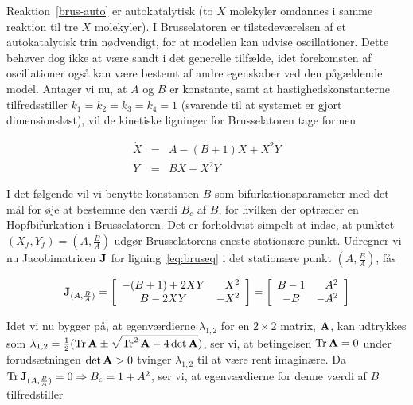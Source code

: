 Reaktion~\ref{brus-auto} er autokatalytisk (to $X$
molekyler omdannes i samme reaktion til tre $X$ molekyler).
I Brusselatoren er tilstedev{\ae}relsen af et
autokatalytisk trin n{\o}dvendigt, for at modellen kan
udvise oscillationer. Dette beh{\o}ver dog ikke at v{\ae}re
sandt i det generelle tilf{\ae}lde, idet forekomsten af
oscillationer ogs{\aa} kan v{\ae}re bestemt af andre
egenskaber ved den p{\aa}g{\ae}ld\-ende model. Antager vi
nu, at $A$ og $B$ er konstante, samt at
hastighedskonstanterne tilfredsstiller $k_1=k_2=k_3=k_4=1$
(svarende til at sy\-stemet er gjort dimensionsl{\o}st),
vil de kinetiske lig\-ninger for Brusselatoren tage formen

\begin{equation}
 \begin{array}{lcl}
  \dot{X} & = & A - (B+1)X + X^2Y \\
  \dot{Y} & = & BX - X^2Y
 \end{array}
 \label{eq:bruseq}
\end{equation}

I det f{\o}lgende vil vi benytte konstanten $B$ som
bifurkationsparameter med det m{\aa}l for {\o}je at
bestemme den v{\ae}rdi $B_c$ af $B$, for hvilken der
optr{\ae}der en Hopfbifurkation i Brusselatoren. Det er
forholdvist simpelt at indse, at punktet
$(X_f,Y_f)=(A,\frac{B}{A})$ udg{\o}r Brusselatorens eneste
station{\ae}re punkt. Udregner vi nu Jacobimatricen ${\bf
J}$ for lig\-ning~\ref{eq:bruseq} i det station{\ae}re
punkt $(A,\frac{B}{A})$, f{\aa}s

\begin{equation}
 {\bf J}_{(A,\frac{B}{A})} =
 \left[
 \begin{array}{cr}
  -(B+1)+2XY &  X^2 \\
      B-2XY  & -X^2
 \end{array}
 \right]
 =
 \left[
 \begin{array}{cr}
  B-1 &  A^2 \\
  -B  & -A^2
 \end{array}
 \right]
\end{equation}

Idet vi nu bygger p{\aa}, at egenv{\ae}rdierne
$\lambda_{1,2}$ for en $2 \times 2$ matrix, ${\bf A}$, kan
udtrykkes som $\lambda_{1,2} = \frac{1}{2}(\mathop{\rm Tr}{\bf A} \pm
\sqrt{\mathop{\rm Tr}^2{\bf A} -4\det{\bf A}})$, ser vi, at betingelsen
$\mathop{\rm Tr} {\bf A} = 0$ under foruds{\ae}tningen $\det {\bf A}>0$
tvinger $\lambda_{1,2}$ til at v{\ae}re rent imagin{\ae}re.
Da $\mathop{\rm Tr} {\bf J}_{(A,\frac{B}{A})} = 0 \Rightarrow B_c =
1+A^2$, ser vi, at egenv{\ae}rdierne for denne v{\ae}rdi af
$B$ tilfredstiller

